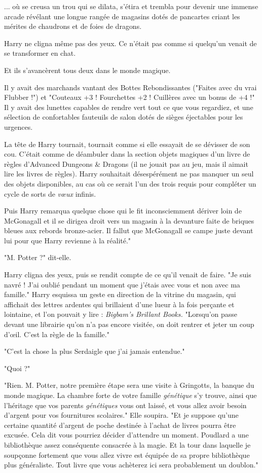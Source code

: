 ... où se creusa un trou qui se dilata, s'étira et trembla pour devenir une immense arcade révélant une longue rangée de magasins dotés de pancartes criant les mérites de chaudrons et de foies de dragons.

Harry ne cligna même pas des yeux. Ce n'était pas comme si quelqu'un venait de se transformer en chat.

Et ils s'avancèrent tous deux dans le monde magique.

Il y avait des marchands vantant des Bottes Rebondissantes ("Faites avec du vrai Flubber !") et "Couteaux +3 ! Fourchettes +2 ! Cuillères avec un bonus de +4 !" Il y avait des lunettes capables de rendre vert tout ce que vous regardiez, et une sélection de confortables fauteuils de salon dotés de sièges éjectables pour les urgences.

La tête de Harry tournait, tournait comme si elle essayait de se dévisser de son cou. C'était comme de déambuler dans la section objets magiques d'un livre de règles d'Advanced Dungeons \& Dragons (il ne jouait pas au jeu, mais il aimait lire les livres de règles). Harry souhaitait désespérément ne pas manquer un seul des objets disponibles, au cas où ce serait l'un des trois requis pour compléter un cycle de sorts de \emph{vœux}  infinis.

Puis Harry remarqua quelque chose qui le fit inconsciemment dériver loin de McGonagall et il se dirigea droit vers un magasin à la devanture faite de briques bleues aux rebords bronze-acier. Il fallut que McGonagall se campe juste devant lui pour que Harry revienne à la réalité."

"M. Potter ?" dit-elle.

Harry cligna des yeux, puis se rendit compte de ce qu'il venait de faire. "Je suis navré ! J'ai oublié pendant un moment que j'étais avec vous et non avec ma famille." Harry esquissa un geste en direction de la vitrine du magasin, qui affichait des lettres ardentes qui brillaient d'une lueur à la fois perçante et lointaine, et l'on pouvait y lire : \emph{Bigbam's Brillant Books.}  "Lorsqu'on passe devant une librairie qu'on n'a pas encore visitée, on doit rentrer et jeter un coup d'œil. C'est la règle de la famille."

"C'est la chose la plus Serdaigle que j'ai jamais entendue."

"Quoi ?"

"Rien. M. Potter, notre première étape sera une visite à Gringotts, la banque du monde magique. La chambre forte de votre famille \emph{génétique } s'y trouve, ainsi que l'héritage que vos parents \emph{génétiques } vous ont laissé, et vous allez avoir besoin d'argent pour vos fournitures scolaires." Elle soupira. "Et je suppose qu'une certaine quantité d'argent de poche destinée à l'achat de livres pourra être excusée. Cela dit vous pourriez décider d'attendre un moment. Poudlard a une bibliothèque assez conséquente consacrée à la magie. Et la tour dans laquelle je soupçonne fortement que vous allez vivre est équipée de sa propre bibliothèque plus généraliste. Tout livre que vous achèterez ici sera probablement un doublon."

